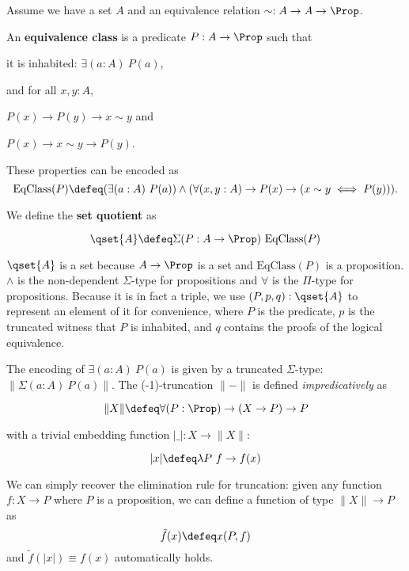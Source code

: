 
Assume we have a set $A$ and an equivalence relation $\sim : A \to A \to \Prop$. 

\begin{definition}
An \textbf{equivalence class} is a predicate $P : A \to \Prop$ such that

it is inhabited: $\exists (a : A) ~P (a)$,

and for all $x, y : A$,

$P(x) \to P(y) \to x \sim y$ and

$P(x) \to x \sim y \to P(y)$.

These properties can be encoded as
$$\text{EqClass}(P) \defeq (\exists (a : A) ~ P (a)) \wedge (\forall (x, y : A) \to P(x) \to (x \sim y \iff P(y))).$$
\end{definition}

\begin{definition}
We define the \textbf{set quotient} as

$$\qset{A} \defeq \Sigma (P : A \to \Prop) ~ \text{EqClass}(P)$$
\end{definition}

$\qset{A}$ is a set because $A \to \Prop$ is a set and $\text{EqClass}(P)$ is a proposition. $\wedge$ is the non-dependent $\Sigma$-type for propositions and $\forall$ is the $\Pi$-type for propositions.
Because it is in fact a triple, we use $(P,p,q) : \qset{A}$ to represent an element of it for convenience, 
where $P$ is the predicate, $p$ is the truncated witness that $P$ is inhabited, and $q$ contains the proofs of the logical equivalence.

 The encoding of $\exists(a : A)~ P(a)$ is given by a truncated $\Sigma$-type: $\| \Sigma(a : A)~P(a) \|$.
The (-1)-truncation $\|-\|$ is defined \emph{impredicatively} as

$$\|X\| \defeq \forall (P : \Prop) \to (X \to P) \to P$$

with a trivial embedding function $|\_| : X \to \| X \|$:

$$| x | \defeq \lambda P ~ f \to f(x)$$

We can simply recover the elimination rule for truncation: given any function $f : X \to P$ where $P$ is a proposition, we can define a function of type $\| X \| \to P$
as 
$$\tilde{f}(x) \defeq x(P,f)$$
and $\tilde{f}(|x|) \equiv f(x)$ automatically holds.

